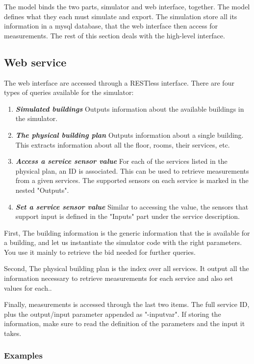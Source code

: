 \documentclass[10pt]{article}
\newcommand{\textdesc}[1]{\textit{\textbf{#1}}} %
\newcommand{\descitem}[1]{\item \textdesc{#1}}
\begin{document}
The model binds the two parts, simulator and web interface, together. The model defines what they
each must simulate and export. The simulation store all its information in a mysql database, that
the web interface then access for measurements. The rest of this section deals with the high-level interface.

\subsection{Web service}

The web interface are accessed through a RESTless interface. There are four types of queries available for the simulator:

\begin{enumerate}
				\descitem{Simulated buildings} Outputs information about the available buildings in
				the simulator.
				\descitem{The physical building plan} Outputs information about a single building.
				This extracts information about all the floor, rooms, their services, etc. 
				\descitem{Access a service sensor value} For each of the services listed in the
				physical plan, an ID is associated. This can be used to retrieve measurements from a
				given services. The supported sensors on each service is marked in the nested
				"Outputs".
				\descitem{Set a service sensor value} Similar to accessing the value, the sensors
				that support input is defined in the "Inputs" part under the service description.
\end{enumerate}

First, The building information is the generic information that the is available for a building, and let us
instantiate the simulator code with the right parameters. You use it mainly to retrieve the bid
needed for further queries.

Second, The physical building plan is the index over all services. It output all the information necessary
to retrieve measurements for each service and also set values for each..

Finally, measurements is accessed through the last two items. The full service ID, plus the
output/input parameter appended as "-inputvar". If storing the information, make sure to read the
definition of the parameters and the input it takes.

\subsubsection{Examples}
\end{document}

